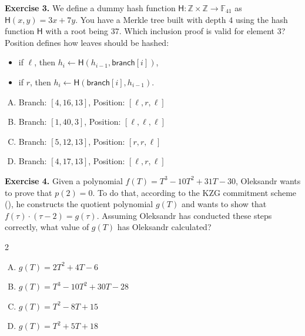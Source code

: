 \documentclass[../../book]{subfiles}
\begin{document}
\textbf{Exercise 3.} We define a dummy hash function $\mathsf{H}: \mathbb{Z} \times
\mathbb{Z} \to \mathbb{F}_{41}$ as $\mathsf{H}(x, y) = 3x+7y$. You have a Merkle tree
built with depth $4$ using the hash function $\mathsf{H}$ with a root being $37$.
Which inclusion proof is valid for element $3$? Position defines how leaves
should be hashed:
\begin{itemize}
    \item if $\ell$, then $h_i \gets \mathsf{H}(h_{i-1}, \mathsf{branch}[i])$,
    \item if $r$, then $h_i \gets \mathsf{H}(\mathsf{branch}[i], h_{i-1})$.
\end{itemize}
\begin{enumerate}[(A)]
    \item Branch: $[4, 16, 13]$, Position: $[\ell,r,\ell]$
    \item Branch: $[1, 40, 3]$, Position: $[\ell, \ell, \ell]$
    \item Branch: $[5, 12, 13]$, Position: $[r, r, \ell]$
    \item Branch: $[4, 17, 13]$, Position: $[\ell, r, \ell]$
\end{enumerate}

\textbf{Exercise 4.} Given a polynomial $f(T) = T^3 - 10T^2 + 31T - 30$, Oleksandr wants to prove that $p(2)=0$. 
To do that, according to the KZG commitment scheme (), he constructs the quotient polynomial $g(T)$ and wants 
to show that $f(\tau) \cdot (\tau - 2) = g(\tau)$. Assuming Oleksandr has conducted these steps correctly, 
what value of $g(T)$ has Oleksandr calculated?

\vspace{-3mm}

\begin{multicols}{2}
    \begin{enumerate}[(A)]
        \item $g(T) = 2T^2 + 4T - 6$
        \item $g(T) = T^3 - 10T^2 + 30T - 28$
        \item $g(T) = T^2 - 8T + 15$
        \item $g(T) = T^2 + 5T + 18$
    \end{enumerate}
\end{multicols}
\end{document}
